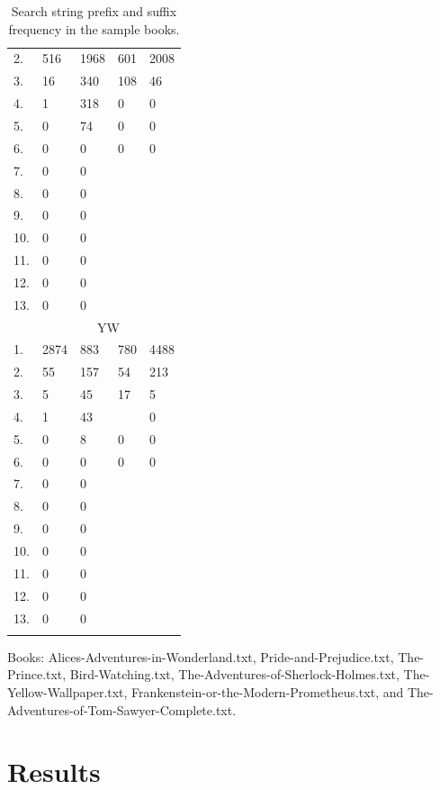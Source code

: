 \documentclass{article}
\begin{document}
\begin{longtable}{l|l|l||l|l}
    2. & 516 & 1968 & 601 & 2008\\
    3. & 16 & 340 & 108 & 46\\
    4. & 1 & 318 & 0 & 0\\
    5. & 0 & 74 & 0 & 0\\
    6. & 0 & 0 & 0 & 0\\
    7. & 0 & 0 & & \\
    8. & 0 & 0 & & \\
    9. & 0 & 0 & & \\
    10. & 0 & 0 & & \\
    11. & 0 & 0 & & \\
    12. & 0 & 0 & & \\
    13. & 0 & 0 & & \\
    \hline
    & \multicolumn{4}{c}{YW} \\
    \hline
    1. & 2874 & 883 & 780 & 4488\\
    2. & 55 & 157 & 54 & 213\\
    3. & 5 & 45 & 17 & 5\\
    4. & 1 & 43 & & 0\\
    5. & 0 & 8 & 0 & 0\\
    6. & 0 & 0 & 0 & 0\\
    7. & 0 & 0 & & \\
    8. & 0 & 0 & & \\
    9. & 0 & 0 & & \\
    10. & 0 & 0 & & \\
    11. & 0 & 0 & & \\
    12. & 0 & 0 & & \\
    13. & 0 & 0 & & \\
    \caption{Search string prefix and suffix frequency in the sample books.}
\end{longtable}



Books: Alices-Adventures-in-Wonderland.txt, Pride-and-Prejudice.txt, The-Prince.txt, Bird-Watching.txt, The-Adventures-of-Sherlock-Holmes.txt, The-Yellow-Wallpaper.txt, Frankenstein-or-the-Modern-Prometheus.txt, and The-Adventures-of-Tom-Sawyer-Complete.txt.

\section{Results} \label{sec:results}
\end{document}
